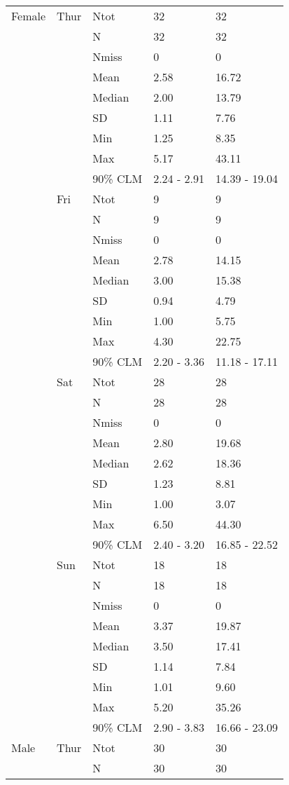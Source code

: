 \documentclass{article}
\begin{document}
\begin{longtable}{p{3cm}llll}
\endlastfoot
Female & Thur & Ntot & 32 & 32 \\
 &  & N & 32 & 32 \\
 &  & Nmiss & 0 & 0 \\
 &  & Mean & 2.58 & 16.72 \\
 &  & Median & 2.00 & 13.79 \\
 &  & SD & 1.11 & 7.76 \\
 &  & Min & 1.25 & 8.35 \\
 &  & Max & 5.17 & 43.11 \\
 &  & 90\% CLM & 2.24 - 2.91 & 14.39 - 19.04 \\
[2ex]
 & Fri & Ntot & 9 & 9 \\
 &  & N & 9 & 9 \\
 &  & Nmiss & 0 & 0 \\
 &  & Mean & 2.78 & 14.15 \\
 &  & Median & 3.00 & 15.38 \\
 &  & SD & 0.94 & 4.79 \\
 &  & Min & 1.00 & 5.75 \\
 &  & Max & 4.30 & 22.75 \\
 &  & 90\% CLM & 2.20 - 3.36 & 11.18 - 17.11 \\
[2ex]
 & Sat & Ntot & 28 & 28 \\
 &  & N & 28 & 28 \\
 &  & Nmiss & 0 & 0 \\
 &  & Mean & 2.80 & 19.68 \\
 &  & Median & 2.62 & 18.36 \\
 &  & SD & 1.23 & 8.81 \\
 &  & Min & 1.00 & 3.07 \\
 &  & Max & 6.50 & 44.30 \\
 &  & 90\% CLM & 2.40 - 3.20 & 16.85 - 22.52 \\
[2ex]
 & Sun & Ntot & 18 & 18 \\
 &  & N & 18 & 18 \\
 &  & Nmiss & 0 & 0 \\
 &  & Mean & 3.37 & 19.87 \\
 &  & Median & 3.50 & 17.41 \\
 &  & SD & 1.14 & 7.84 \\
 &  & Min & 1.01 & 9.60 \\
 &  & Max & 5.20 & 35.26 \\
 &  & 90\% CLM & 2.90 - 3.83 & 16.66 - 23.09 \\
[2ex]
Male & Thur & Ntot & 30 & 30 \\
 &  & N & 30 & 30 \\

\end{longtable}
\end{document}
